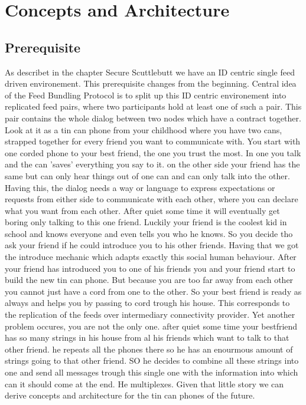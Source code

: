 \chapter{Concepts and Architecture}

\section{Prerequisite}
As describet in the chapter Secure Scuttlebutt we have an ID centric single feed driven environement. This prerequisite changes from the beginning. Central idea of the Feed Bundling Protocol is to split up this ID centric environement into replicated feed pairs, where two participants hold at least one of such a pair. This pair contains the whole dialog between two nodes which have a contract together.\\
Look at it as a tin can phone from your childhood where you have two cans, strapped together for every friend you want to communicate with. You start with one corded phone to your best friend, the one you trust the most. In one you talk and the can 'saves' everything you say to it. on the other side your friend has the same but can only hear things out of one can and can only talk into the other. Having this, the dialog needs a way or language to express expectations or requests from either side to communicate with each other, where you can declare what you want from each other. After quiet some time it will eventually get boring only talking to this one friend. Luckily your friend is the coolest kid in school and knows everyone and even tells you who he knows. So you decide tho ask your friend if he could introduce you to his other friends. Having that we got the introduce mechanic which adapts exactly this social human behaviour. After your friend has introduced you to one of his friends you and your friend start to build the new tin can phone. But because you are too far away from each other you cannot just have a cord from one to the other. So your best friend is ready as always and helps you by passing to cord trough his house. This corresponds to the replication of the feeds over intermediary connectivity provider. Yet another problem occures, you are not the only one. after quiet some time your bestfriend has so many strings in his house from al his friends which want to talk to that other friend. he repeats all the phones there so he has an enourmous amount of strings going to that other friend. SO he decides to combine all these strings into one and send all messages trough this single one with the information into which can it should come at the end. He multiplexes. Given that little story we can derive concepts and architecture for the tin can phones of the future.
